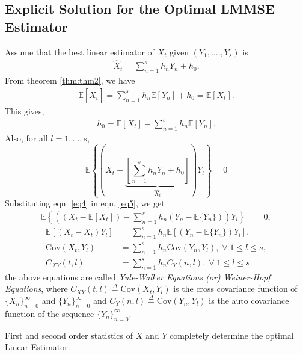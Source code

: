 \documentclass[a4paper,english,12pt]{article}
\begin{document}
\subsection{Explicit Solution for the Optimal LMMSE \\ Estimator}
Assume that the best linear estimator of $X_t$ given $(Y_1,....,Y_s)$ is
\begin{align}
	\hat{X}_t=\sum_{n=1}^s h_nY_n+h_0.
\end{align}
From theorem \ref{thm:thm2}, we have
\begin{align}
\mathbb{E}[\hat{X}_{t}]=\sum_{n=1}^{s}{h_n\mathbb{E}[Y_n]}+h_0=\mathbb{E}[X_{t}].
\end{align}
This gives,
\begin{align}
h_0=\mathbb{E}[X_t]-
 \sum_{n=1}^{s}{h_n\mathbb{E}[Y_{n}]}.\label{eq4}  
\end{align}
Also, for all $l=1,\dots,s$,
\begin{equation}
  \mathbb{E}\left\lbrace\left(X_{t}-\underbrace{\left[\sum_{n=1}^{s}{h_nY_n}+h_0\right]}_{\hat{X}_t}\right)Y_l\right\rbrace = 0\label{eq5}
\end{equation}  
Substituting eqn. \eqref{eq4} in eqn. \eqref{eq5}, we get
 \begin{align}
\mathbb{E}\left\lbrace\left((X_{t}-\mathbb{E}[X_t])-\sum_{n=1}^{s}h_n(Y_n-\mathbb{E}\lbrace Y_n \rbrace)\right)Y_l\right\rbrace&=0, 
\end{align}
\begin{align}
\mathbb{E}[(X_{t}-X_t)Y_l]&=
\sum_{n=1}^{s}h_n\mathbb{E}\left[\left(Y_n-\mathbb{E}\lbrace Y_n \rbrace\right)Y_l\right], \nonumber \\
\text{Cov}(X_t,Y_l)&=\sum_{n=1}^{s} h_n\text{Cov}(Y_n,Y_l), \; \forall\; 1\leq l \leq s, \nonumber\\
C_{XY}(t,l)&=\sum_{n=1}^{s} h_nC_Y(n,l), \; \forall \; 1\leq l
\leq s.
\end{align}
the above equations are called \textit{Yule-Walker Equations (or) Weiner-Hopf Equations},
where
$C_{XY}(t,l) \overset{\Delta}{=} \text{Cov}(X_t,Y_l)$ is the cross covariance function of 
$\{ X_n \}_{n=0}^{\infty}$ and $\{ Y_n \}_{n=0}^{\infty} $ and  $C_Y(n,l)\overset{\Delta}{=} \text{Cov}(Y_n,Y_l)$ is the auto covariance function of the sequence  $\{ Y_n \}_{n=0}^{\infty} $.
\begin{note}
First and second order statistics of $X$ and $Y$ completely determine the optimal Linear Estimator.
\end{note}
\end{document}
